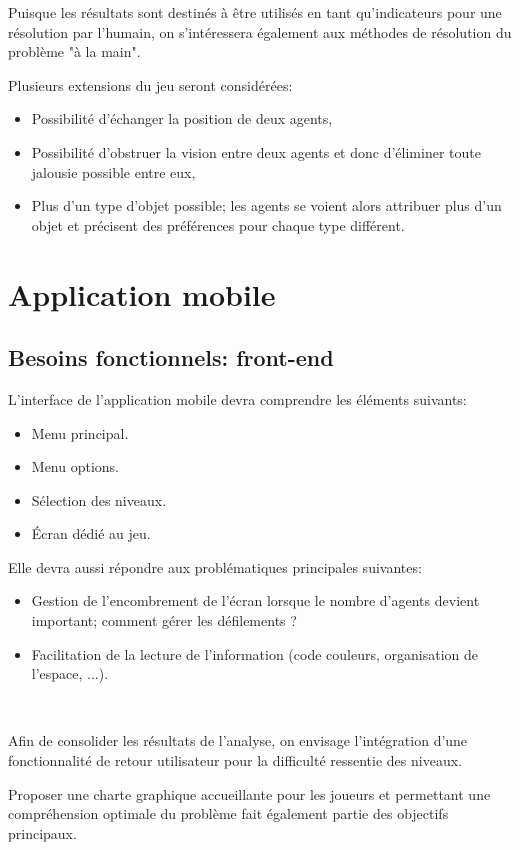 \documentclass[a4paper, 11pt, titlepage, oneside]{report}
\begin{document}
Puisque les résultats sont destinés à être utilisés en tant qu'indicateurs pour une résolution par l'humain, on s'intéressera également aux méthodes de résolution du problème "à la main".

Plusieurs extensions du jeu seront considérées:
\begin{itemize}
	\item Possibilité d’échanger la position de deux agents,
	\item Possibilité d’obstruer la vision entre deux agents et donc d’éliminer toute jalousie possible entre eux,
	\item Plus d’un type d’objet possible; les agents se voient alors attribuer plus d’un objet et précisent des préférences pour chaque type différent.
\end{itemize}

	\section{Application mobile}
	\label{sec:app}
		\subsection{Besoins fonctionnels: front-end}
		
L’interface de l’application mobile devra comprendre les éléments suivants:
\begin{itemize}
	\item Menu principal.
	\item Menu options.
	\item Sélection des niveaux.
	\item Écran dédié au jeu.
\end{itemize}

Elle devra aussi répondre aux problématiques principales suivantes: 
\begin{itemize}
	\item Gestion de l’encombrement de l'écran lorsque le nombre d’agents devient important; comment gérer les défilements ?
	\item Facilitation de la lecture de l’information (code couleurs, organisation de l’espace, ...).
\end{itemize}\

Afin de consolider les résultats de l’analyse, on envisage l’intégration d’une fonctionnalité de retour utilisateur pour la difficulté ressentie des niveaux.

Proposer une charte graphique accueillante pour les joueurs et permettant une compréhension optimale du problème fait également partie des objectifs principaux.
\end{document}
